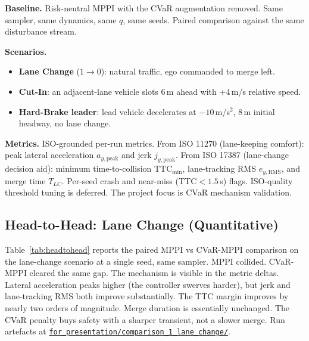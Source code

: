 \documentclass[letterpaper, 10 pt, conference]{ieeeconf}
\newcommand{\repoBase}{https://github.com/USERNAME/mppi-cvar-lane-change-project}
\newcommand{\repolink}[2]{\href{\repoBase/tree/main/#1}{\texttt{#2}}}
\begin{document}
\textbf{Baseline.} Risk-neutral MPPI \cite{williams2017mppi} with the CVaR augmentation removed. Same sampler, same dynamics, same $q$, same seeds. Paired comparison against the same disturbance stream.

\textbf{Scenarios.}
\begin{itemize}
    \item \textbf{Lane Change} ($1 \to 0$): natural traffic, ego commanded to merge left.
    \item \textbf{Cut-In}: an adjacent-lane vehicle slots 6\,m ahead with $+4$\,m/s relative speed.
    \item \textbf{Hard-Brake leader}: lead vehicle decelerates at $-10$\,m/s$^2$, 8\,m initial headway, no lane change.
\end{itemize}

\textbf{Metrics.} ISO-grounded per-run metrics. From ISO 11270 (lane-keeping comfort): peak lateral acceleration $a_{y,\mathrm{peak}}$ and jerk $j_{y,\mathrm{peak}}$. From ISO 17387 (lane-change decision aid): minimum time-to-collision $\mathrm{TTC}_\mathrm{min}$, lane-tracking RMS $e_{y,\mathrm{RMS}}$, and merge time $T_{LC}$. Per-seed crash and near-miss ($\mathrm{TTC} < 1.5$\,s) flags. ISO-quality threshold tuning is deferred. The project focus is CVaR mechanism validation.

\subsection{Head-to-Head: Lane Change (Quantitative)}

Table~\ref{tab:headtohead} reports the paired MPPI vs CVaR-MPPI comparison on the lane-change scenario at a single seed, same sampler. MPPI collided. CVaR-MPPI cleared the same gap. The mechanism is visible in the metric deltas. Lateral acceleration peaks higher (the controller swerves harder), but jerk and lane-tracking RMS both improve substantially. The TTC margin improves by nearly two orders of magnitude. Merge duration is essentially unchanged. The CVaR penalty buys safety with a sharper transient, not a slower merge. Run artefacts at \repolink{for_presentation/comparison_1_lane_change}{for\_presentation/comparison\_1\_lane\_change/}.
\end{document}
